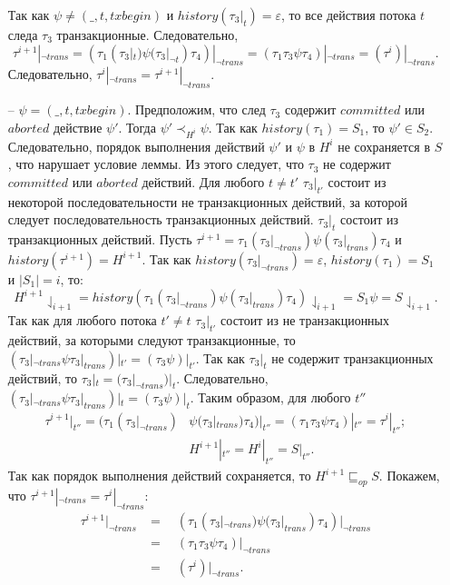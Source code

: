 \begin{myproof}
\begin{itemize}
Так как $\psi \neq (\_, t, txbegin)$ и $history(\tau_3|_t) = \varepsilon$, то все действия потока $t$ следа $\tau_3$ транзакционные. Следовательно, $$\tau^{i+1}|_{\neg trans} = (\tau_1(\tau_3|_t)\psi(\tau_3|_{\neg t})\tau_4)|_{\neg trans} = (\tau_1\tau_3\psi\tau_4)|_{\neg trans} = (\tau^i)|_{\neg trans}.$$
Следовательно, $\tau^i|_{\neg trans} = \tau^{i+1}|_{\neg trans}$.
\item[--] $\psi = (\_, t, txbegin)$. Предположим, что след $\tau_3$ содержит $committed$ или $aborted$ действие $\psi'$. Тогда $\psi' \prec_{H^{i}} \psi$. Так как $history(\tau_1) = S_1$, то $\psi' \in S_2$. Следовательно, порядок выполнения действий $\psi'$ и $\psi$ в $H^i$ не сохраняется в $S$, что нарушает условие леммы. Из этого следует, что $\tau_3$ не содержит $committed$ или $aborted$ действий. Для любого $t \neq t'$ $\tau_3|_{t'}$ состоит из некоторой последовательности не транзакционных действий, за которой следует последовательность транзакционных действий. $\tau_3|_t$ состоит из транзакционных действий. Пусть $\tau^{i+1} = \tau_1(\tau_3|_{\neg trans})\psi(\tau_3|_{trans})\tau_4$ и $history(\tau^{i+1}) = H^{i+1}$. Так как $history(\tau_3|_{\neg trans}) = \varepsilon$, $history(\tau_1) = S_1$ и $|S_1| = i$, то: $$H^{i+1}\downharpoonleft_{i+1} = history(\tau_1(\tau_3|_{\neg trans})\psi(\tau_3|_{trans})\tau_4)\downharpoonleft_{i+1} = S_1\psi = S\downharpoonleft_{i+1}.$$ Так как для любого потока $t' \neq t$ $\tau_3|_{t'}$ состоит из не транзакционных действий, за которыми следуют транзакционные, то $(\tau_3|_{\neg trans}\psi\tau_3|_{trans})|_{t'} = (\tau_3\psi)|_{t'}$. Так как $\tau_3|_t$ не содержит транзакционных действий, то $\tau_3|_t = (\tau_3|_{\neg trans})|_t$. Следовательно, $(\tau_3|_{\neg trans}\psi\tau_3|_{trans})|_t = (\tau_3\psi)|_t$. Таким образом, для любого $t''$
\begin{align*}
\tau^{i+1}|_{t''} = (\tau_1(\tau_3|_{\neg trans})&\psi(\tau_3|_{trans})\tau_4)|_{t''} = (\tau_1\tau_3\psi\tau_4)|_{t''} = \tau^i|_{t''}; \\   
&H^{i+1}|_{t''} = H^i|_{t''} = S|_{t''}.
\end{align*}
Так как порядок выполнения действий сохраняется, то $H^{i+1} \sqsubseteq_{op} S$. Покажем, что $\tau^{i+1}|_{\neg trans} = \tau^{i}|_{\neg trans}$:
\begin{align*}
\tau^{i+1}|_{\neg trans} &= \quad (\tau_1(\tau_3|_{\neg trans})\psi(\tau_3|_{trans})\tau_4)|_{\neg trans}  \\
                         &= \quad (\tau_1\tau_3\psi\tau_4)|_{\neg trans} \\
                         &= \quad (\tau^i)|_{\neg trans}.
\end{align*}
\end{itemize}
\end{myproof}

